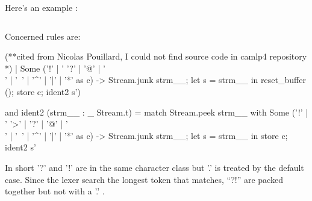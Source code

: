 
Here's an example :

\inputminted[fontsize=\scriptsize, ]{ocaml}{camlp4/code/lexer_test.ml}
Concerned rules are:
\begin{ocamlcode}
(**cited from Nicolas Pouillard, I could not find source code in
  camlp4 repository *)
 | Some
        ('!' | '%
         '?' | '@' | '\\' | '~' | '^' | '|' | '*' as c) ->
        Stream.junk strm__;
        let s = strm__ in reset_buffer (); store c; ident2 s')

and ident2 (strm__ : _ Stream.t) =
    match Stream.peek strm__ with
      Some
        ('!' | '%
         '>' | '?' | '@' | '\\' | '~' | '^' | '|' | '*' as c) ->
        Stream.junk strm__; let s = strm__ in store c; ident2 s'

\end{ocamlcode}

In short '?' and '!' are in the same character class but '.' is
treated by the default case. Since the lexer search the longest token
that matches, ``?!'' are packed together but not with a '.' .
